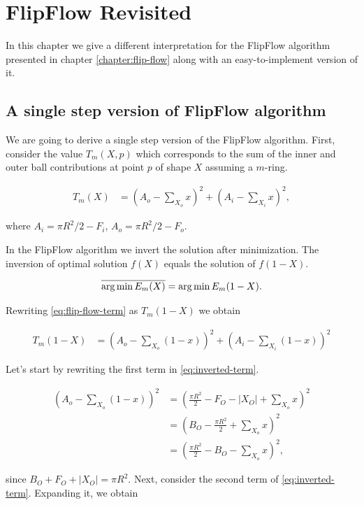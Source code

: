 \chapter{FlipFlow Revisited}
\label{chapter:flip-flow-revisited}

In this chapter we give a different interpretation for the FlipFlow algorithm presented in chapter \ref{chapter:flip-flow} along with an easy-to-implement version of it.

\section{A single step version of FlipFlow algorithm}
We are going to derive a single step version of the FlipFlow algorithm. First, consider the value $T_m(X,p)$ which corresponds to the sum of the inner and outer ball contributions at point $p$ of shape $X$ assuming a $m$-ring.

\begin{align}
	T_m(X) &= (A_o - \sum_{X_o}{x})^2  + (A_i - \sum_{X_i}{x})^2 
	\label{eq:flip-flow-term},
\end{align}

where $A_i=\pi R^2/2 - F_i$, $A_o=\pi R^2/2 - F_o$.

In the FlipFlow algorithm we invert the solution after minimization. The inversion of optimal solution $f(X)$ equals the solution of $f(1-X)$.

\begin{align*}
	\overline{\operatorname*{arg\,min} E_m(X)} = \operatorname*{arg\,min} E_m(1-X).
\end{align*}

Rewriting \eqref{eq:flip-flow-term} as $T_m(1-X)$ we obtain

\begin{align}
	T_m(1-X) &= (A_o - \sum_{X_o}{(1-x)})^2 + (A_i - \sum_{X_i}{(1-x)})^2
	\label{eq:inverted-term}
\end{align}

Let's start by rewriting the first term in \eqref{eq:inverted-term}.

\begin{align}
	(A_o - \sum_{X_o}{(1-x)})^2 &= (\frac{\pi R^2}{2} - F_O - |X_O| + \sum_{X_o}{x})^2 \nonumber \\
	&= 	(B_O - \frac{\pi R^2}{2} + \sum_{X_o}{x})^2 \nonumber \\
	&= (\frac{\pi R^2}{2} - B_O - \sum_{X_o}{x})^2,
	\label{eq:first-sum-inverted-term}
\end{align}

since $B_O+F_O+|X_O| = \pi R^2$. Next, consider the second term of \eqref{eq:inverted-term}. Expanding it, we obtain

